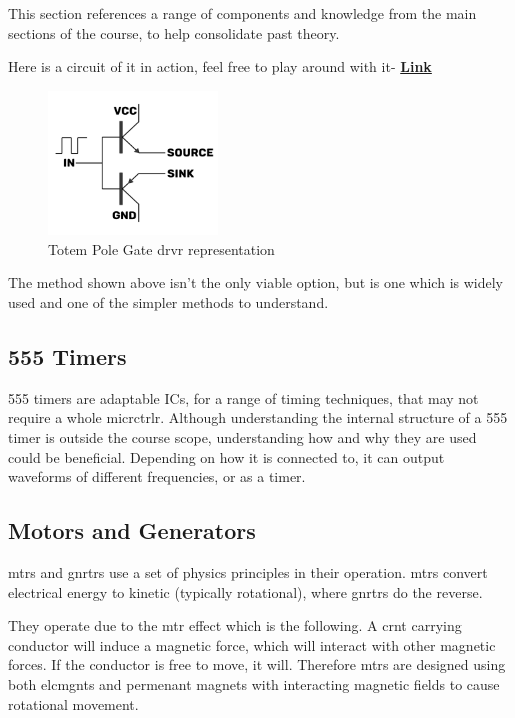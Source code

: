 \documentclass[a4paper,11pt]{report}
\let\oldhref\href %
\renewcommand{\href}[2]{\oldhref{#1}{\bfseries#2}}
\begin{document}
This section references a range of components and knowledge from the main sections of the course, to help consolidate past theory.

Here is a circuit of it in action, feel free to play around with it- \href{https://tinyurl.com/2m77d6zl}{Link}

\begin{figure}[H]
\centering
\includegraphics[width=0.4\textwidth]{gatedriver1}
\caption{Totem Pole Gate \gls{drvr} representation}
\end{figure}

The method shown above isn't the only viable option, but is one which is widely used and one of the simpler methods to understand.

\vspace*{1\baselineskip}

\subsection{555 Timers}

555 timers are adaptable ICs, for a range of timing techniques, that may not require a whole \gls{micrctrlr}. Although understanding the internal structure of a 555 timer is outside the course scope, understanding how and why they are used could be beneficial.
Depending on how it is connected to, it can output waveforms of different frequencies, or as a timer.

\vspace*{1\baselineskip}

\subsection{Motors and Generators}

\gls{mtr}s and \gls{gnrtr}s use a set of physics principles in their operation. \gls{mtr}s convert electrical energy to kinetic (typically rotational), where \gls{gnrtr}s do the reverse.

They operate due to the \gls{mtr} effect which is the following. A \gls{crnt} carrying conductor will induce a magnetic force, which will interact with other magnetic forces. If the conductor is free to move, it will. Therefore \gls{mtr}s are designed using both \gls{elcmgnt}s and permenant magnets with interacting magnetic fields to cause rotational movement.
\end{document}
